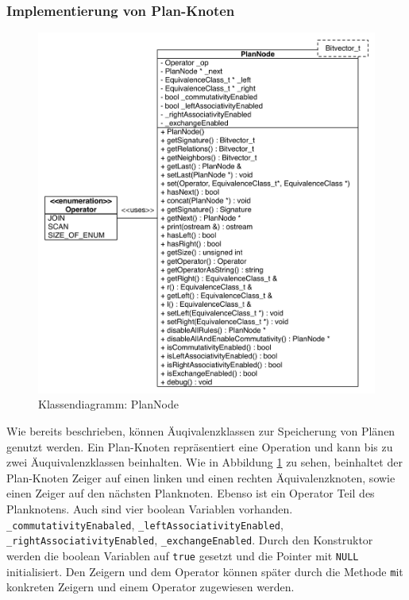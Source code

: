 \subsubsection{Implementierung von Plan-Knoten}

\begin{figure}[ht]
  \centering
  \includegraphics[width=\textwidth]{04_Implementierung/00_media/PlanNodeClass.pdf}
  \caption{Klassendiagramm: PlanNode}
  \label{PlanNodeClass}
\end{figure}

Wie bereits beschrieben, können Äuqivalenzklassen zur Speicherung von Plänen genutzt werden. Ein Plan-Knoten repräsentiert eine Operation und kann bis zu zwei Äuquivalenzklassen beinhalten. Wie in Abbildung \ref{PlanNodeClass} zu sehen, beinhaltet der Plan-Knoten Zeiger auf einen linken und einen rechten Äquivalenzknoten, sowie einen Zeiger auf den nächsten Planknoten. Ebenso ist ein Operator Teil des Planknotens. Auch sind vier boolean Variablen vorhanden. \texttt{\_commutativityEnabaled}, \texttt{\_leftAssociativityEnabled},  \texttt{\_rightAssociativityEnabled},  \texttt{\_exchangeEnabled}. Durch den Konstruktor werden die boolean Variablen auf \texttt{true} gesetzt und die Pointer mit \texttt{NULL} initialisiert. Den Zeigern und dem Operator können später durch die Methode \texttt mit konkreten Zeigern und einem Operator zugewiesen werden.



